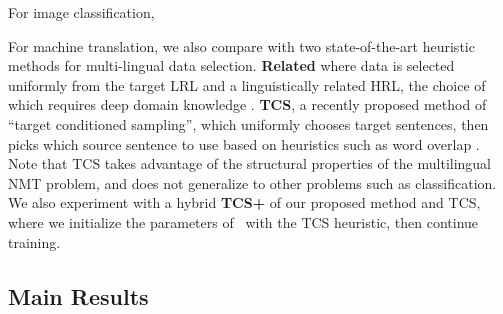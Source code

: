 For image classification, 

For machine translation, we also compare with two state-of-the-art heuristic methods for multi-lingual data selection.
\textbf{Related} where data is selected uniformly from the target LRL and a linguistically related HRL, the choice of which requires deep domain knowledge \citep{rapid_adapt_nmt}.
\textbf{TCS}, a recently proposed method of ``target conditioned sampling'', which uniformly chooses target sentences, then picks which source sentence to use based on heuristics such as word overlap \citep{TCS}.
Note that TCS takes advantage of the structural properties of the multilingual NMT problem, and does not generalize to other problems such as classification.
We also experiment with a hybrid \textbf{TCS+\dds} of our proposed method and TCS, where we initialize the parameters of \dds~with the TCS heuristic, then continue training.



\subsection{Main Results}

